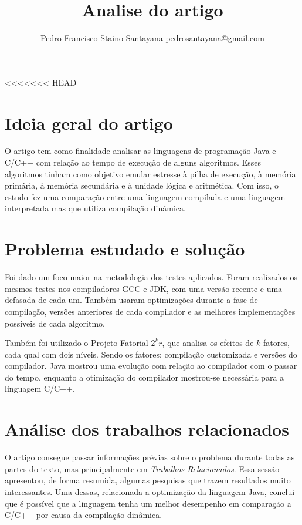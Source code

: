\documentclass[12pt]{article}
\title{Analise do artigo}
\title{}
\author{Pedro Francisco Staino Santayana pedrosantayana@gmail.com}
\date{}
\begin{document}
<<<<<<< HEAD

\maketitle

\section*{Ideia geral do artigo}
O artigo\cite{inproceedings} tem como finalidade analisar as linguagens de programação Java e C/C++
com relação ao tempo de execução de alguns algoritmos. Esses algoritmos tinham
como objetivo emular estresse à pilha de execução, à memória primária, 
à memória secundária e à unidade lógica e aritmética. Com isso, o estudo fez uma comparação
entre uma linguagem compilada e uma linguagem interpretada mas que utiliza compilação dinâmica.

\section*{Problema estudado e solução}

Foi dado um foco maior na metodologia dos testes aplicados. Foram realizados os mesmos
testes nos compiladores GCC e JDK, com uma versão recente e uma defasada de cada um.
Também usaram optimizações durante a fase de compilação, versões anteriores de cada compilador
e as melhores implementações possíveis de cada algoritmo.

Também foi utilizado o Projeto Fatorial $2^kr$, que analisa os efeitos de $k$ fatores,
cada qual com dois níveis. Sendo os fatores: compilação customizada e 
versões do compilador. Java mostrou uma evolução com relação ao compilador com o passar do tempo,
enquanto a otimização do compilador mostrou-se necessária para a linguagem C/C++. 

\section*{Análise dos trabalhos relacionados}
O artigo consegue passar informações prévias sobre o problema durante todas as partes
do texto, mas principalmente em \textit{Trabalhos Relacionados}. Essa sessão apresentou,
de forma resumida, algumas pesquisas que trazem resultados muito interessantes. Uma dessas, relacionada a optimização da linguagem Java,
conclui que é possível que a linguagem tenha um melhor desempenho em comparação a C/C++
por causa da compilação dinâmica.
\end{document}
